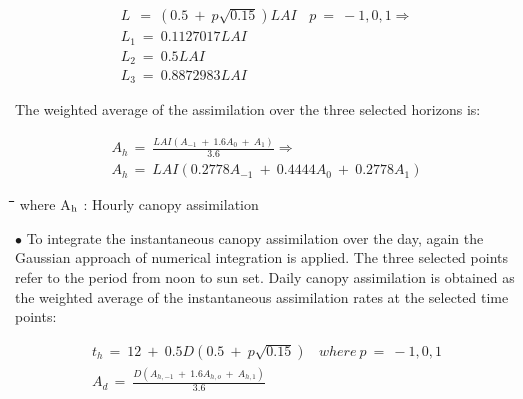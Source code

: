 \documentclass[11pt]{article}
\begin{document}
\begin{eqnarray*}
 L~~=~(0.5~+~p \sqrt{0.15} )LAI~~~~p~=~-1,0,1 \Rightarrow   \nonumber  \\
L _{1} ~=~0.1127017LAI \nonumber  \\
L _{2} ~=~0.5LAI \nonumber  \\
L _{3} ~=~0.8872983LAI
\end{eqnarray*}

\bigskip
\bigskip
\bigskip
\bigskip
\bigskip
\bigskip
The weighted average of the assimilation over the three selected horizons is: 

\begin{eqnarray*}
A _{h~} =~{\frac{LAI(A _{-1} ~+~1.6A _{0} ~+~A _{1} )}{3.6}} \Rightarrow   \nonumber  \\
A _{h~} =~LAI(0.2778A _{-1} ~+~0.4444A _{0} ~+~0.2778A _{1} )
\end{eqnarray*}

\bigskip
\bigskip
\bigskip
\nwln
\begin{tabbing}
\hspace{1.27cm}\=\hspace{1.27cm}\=\hspace{1.27cm}\=\hspace{1.27cm}\=%
\hspace{1.27cm}\=\hspace{1.27cm}\=\hspace{1.27cm}\=\hspace{1.27cm}\=%
\hspace{1.27cm}\=\hspace{1.27cm}\=\kill
where\> A$_{{\rm h}}$\> : Hourly canopy assimilation\> \> \> \> \>   \> \> \> [g CO$_{{\rm 2}}$ m$^{{\rm -2}}$ h$^{{\rm -1}}$]
\end{tabbing}

\bigskip
\bigskip
$\bullet$ To integrate the instantaneous canopy assimilation over the day, again the Gaussian
approach of numerical integration is applied. The three selected points refer to the period
from noon to sun set. Daily canopy assimilation is obtained as the weighted average of the
instantaneous assimilation rates at the selected time points:

\begin{eqnarray*}
t _{h~} =~ 12 ~+~ 0.5D(0.5~+~p \sqrt{0.15} ) ~~~~where~p~=~-1,0,1  \nonumber  \\
A _{d~} =~{\frac{D(A _{h,-1} ~+~ 1.6A _{h,o} ~+~A _{h,1} )}{3.6}}
\end{eqnarray*}
\end{document}

